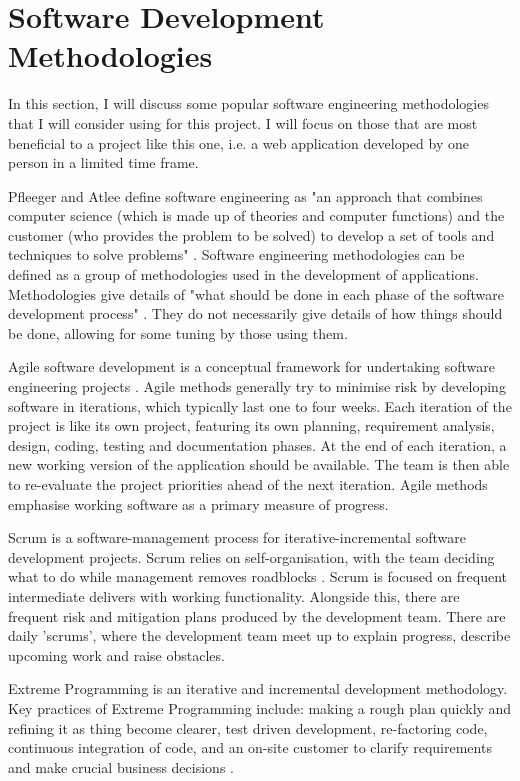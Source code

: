 \documentclass[authoryearcitations]{UoYCSproject}
\begin{document}
\section{Software Development Methodologies}

In this section, I will discuss some popular software engineering methodologies that I will consider using for this project. I will focus on those that are most beneficial to a project like this one, i.e. a web application developed by one person in a limited time frame. 

Pfleeger and Atlee define software engineering as "an approach that combines computer science (which is made up of theories and computer functions) and the customer (who provides the problem to be solved) to develop a set of tools and techniques to solve problems" \citep{Pfleeger}. Software engineering methodologies can be defined as a group of methodologies used in the development of applications. Methodologies give details of "what should be done in each phase of the software development process" \citep{Mnkandla2009}. They do not necessarily give details of how things should be done, allowing for some tuning by those using them. 

Agile software development is a conceptual framework for undertaking software engineering projects \citep{ITKnowledgePortal}. Agile methods generally try to minimise risk by developing software in iterations, which typically last one to four weeks. Each iteration of the project is like its own project, featuring its own planning, requirement analysis, design, coding, testing and documentation phases. At the end of each iteration, a new working version of the application should be available. The team is then able to re-evaluate the project priorities ahead of the next iteration. Agile methods emphasise working software as a primary measure of progress.

Scrum is a software-management process for iterative-incremental software development projects. Scrum relies on self-organisation, with the team deciding what to do while management removes roadblocks \citep{Faridani2011}. Scrum is focused on frequent intermediate delivers with working functionality. Alongside this, there are frequent risk and mitigation plans produced by the development team. There are daily 'scrums', where the development team meet up to explain progress, describe upcoming work and raise obstacles. 

Extreme Programming is an iterative and incremental development methodology. Key practices of Extreme Programming include: making a rough plan quickly and refining it as thing become clearer, test driven development, re-factoring code, continuous integration of code, and an on-site customer to clarify requirements and make crucial business decisions \citep{Faridani2011}. 
\end{document}
